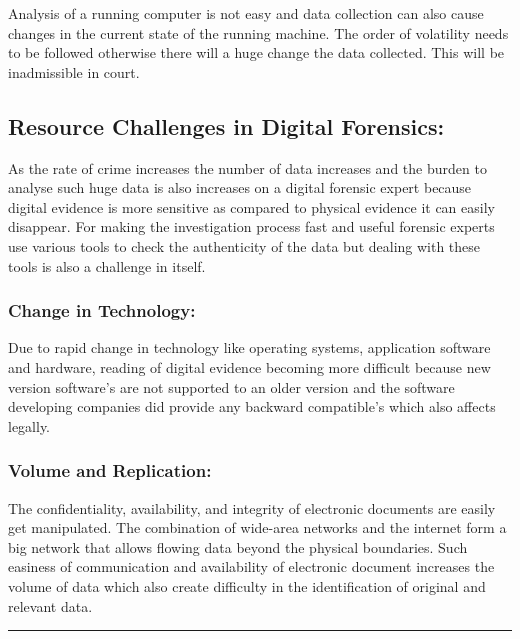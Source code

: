 \documentclass[british]{article}
\begin{document}
Analysis of a running computer is not easy and data collection can
also cause changes in the current state of the running machine. The
order of volatility needs to be followed otherwise there will a huge
change the data collected. This will be inadmissible in court.

\subsection{Resource Challenges in Digital Forensics:}

As the rate of crime increases the number of data increases and the
burden to analyse such huge data is also increases on a digital forensic
expert because digital evidence is more sensitive as compared to physical
evidence it can easily disappear. For making the investigation process
fast and useful forensic experts use various tools to check the authenticity
of the data but dealing with these tools is also a challenge in itself.

\subsubsection{Change in Technology:}

Due to rapid change in technology like operating systems, application
software and hardware, reading of digital evidence becoming more difficult
because new version software's are not supported to an older version
and the software developing companies did provide any backward compatible's
which also affects legally.

\subsubsection{Volume and Replication:}

The confidentiality, availability, and integrity of electronic documents
are easily get manipulated. The combination of wide-area networks
and the internet form a big network that allows flowing data beyond
the physical boundaries. Such easiness of communication and availability
of electronic document increases the volume of data which also create
difficulty in the identification of original and relevant data.

\rule[0.5ex]{0.75\columnwidth}{1pt}
\end{document}
